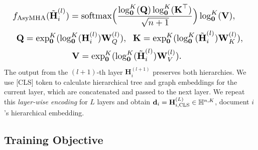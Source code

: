 \begin{equation}
\resizebox{1\columnwidth}{!}{
$ \begin{split}
    f_{\text{AsyMHA}}(\tilde{\textbf{H}}_i^{(l)})=\text{softmax}&\Big(\dfrac{\log_{\textbf{0}}^K(\textbf{Q})\log_{\textbf{0}}^K(\textbf{K}^\top)}{\sqrt{n+1}}\Big)\log_{\textbf{0}}^K(\textbf{V}),\\
    \textbf{Q}=\exp_{\textbf{0}}^K(\log_{\textbf{0}}^K(\textbf{H}_i^{(l)})\textbf{W}&_Q^{(l)}),\;\  \textbf{K}=\exp_{\textbf{0}}^K(\log_{\textbf{0}}^K(\tilde{\textbf{H}}_i^{(l)})\textbf{W}_K^{(l)}),\;\  \\
    \textbf{V}=\exp_{\textbf{0}}^K&(\log_{\textbf{0}}^K(\tilde{\textbf{H}}_i^{(l)})\textbf{W}_V^{(l)}).
\end{split} $
}
\end{equation}
The output from the $ (l+1) $-th layer $ \textbf{H}_i^{(l+1)} $ preserves both hierarchies. %
We use [CLS] token to calculate hierarchical tree and graph embeddings for the current layer, which are concatenated and passed to the next layer. We repeat this \emph{layer-wise encoding} for $ L $ layers and obtain $ \textbf{d}_i=\textbf{H}_{i,\text{CLS}}^{(L)}\in\Bbb H^{n,K} $, document $ i $'s hierarchical embedding. %

\subsection{Training Objective}
\label{sec:training_objective}

